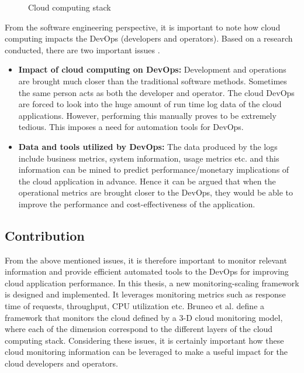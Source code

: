 \documentclass[article,type=msc,colorback,12pt,accentcolor=tud8b,table]{tudthesis}
\begin{document}
 \begin{figure}
 \begin{center}
\end{center}
\caption{Cloud computing stack}
\label{fig:ccstack}
\end{figure}

%	
%	
%	
	
 From the software engineering perspective, it is important to note how cloud computing impacts the DevOps (developers and operators). Based on a research conducted, there are two important issues \cite{cito2015making}. 

\begin{itemize}
	\item \textbf{Impact of cloud computing on DevOps:}
	Development and operations are brought much closer than the traditional software methods. Sometimes the same person acts as both the developer and operator. The cloud DevOps are forced to look into the huge amount of run time log data of the cloud applications. However, performing this manually proves to be extremely tedious. This imposes a need for automation tools for DevOps.
	
	\item \textbf{Data and tools utilized by DevOps:}
	The data produced by the logs include business metrics, system information, usage metrics etc. and this information can be mined to predict performance/monetary implications of the cloud application in advance. Hence it can be argued that when the operational metrics are brought closer to the DevOps, they would be able to improve the performance and cost-effectiveness of the application.
	
\end{itemize}
 
	\subsection{Contribution}	
	
	From the above mentioned issues, it is therefore important to monitor relevant information and provide efficient automated tools to the DevOps for improving cloud application performance. In this thesis, a new monitoring-scaling framework is designed and implemented. It leverages monitoring metrics such as response time of requests, throughput, CPU utilization etc. Bruneo et al.\cite{bruneo2015framework} define a framework that monitors the cloud defined by a 3-D cloud monitoring model, where each of the dimension correspond to the different layers of the cloud computing stack. Considering these issues, it is certainly important how these cloud monitoring information can be leveraged to make a useful impact for the cloud developers and operators. 
	
\end{document}
